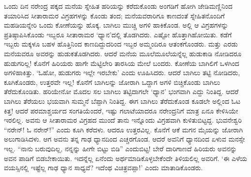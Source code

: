 ಒಂದು ದಿನ ನರೇಂದ್ರ ಪಕ್ಕದ ಮನೆಯ ಸ್ನೇಹಿತ ಹರಿಯನ್ನು ಕರೆದುಕೊಂಡು ಅಂಗಡಿಗೆ ಹೋಗಿ ಜೇಡಿಮಣ್ಣಿನಿಂದ ತಯಾರಿಸಿದ ಸೀತಾರಾಮರ ವಿಗ್ರಹಗಳನ್ನು ಕೊಂಡು ತಂದ; ಮನೆಯವರಾರಿಗೂ ಕಾಣದಂತೆ ಸ್ನೇಹಿತನೊಂದಿಗೆ ಮಹಡಿಯನ್ನೇರಿ ಒಂದು ಕೋಣೆಯನ್ನು ಹೊಕ್ಕ. ಬಾಗಿಲು ಮುಚ್ಚಿ ಅಗಳಿ ಹಾಕಿಕೊಂಡ. ಅಲ್ಲಿ ಆ ವಿಗ್ರಹಗಳನ್ನು ಪ್ರತಿಷ್ಠಾಪಿಸಿಕೊಂಡು ಇಬ್ಬರೂ ಸೀತಾರಾಮರ ‘ಧ್ಯಾನ’ದಲ್ಲಿ ತೊಡಗಿದರು. ಎಷ್ಟೋ ಹೊತ್ತಾಗಿಹೋಯಿತು. ಕಡೆಗೆ ಇಬ್ಬರು ಮಕ್ಕಳೂ ಬಹಳ ಹೊತ್ತಿನಿಂದ ಕಾಣದಿದ್ದುದರಿಂದ ಇಬ್ಬರ ಅಮ್ಮಂದಿರೂ ಆತಂಕಗೊಂಡರು. ಮತ್ತು ಎರಡು ಮನೆಯವರೂ ಅವರನ್ನು ಹುಡುಕತೊಡಗಿದರು. ಆದರೆ ಮನೆಯ ಮೂಲೆಮೂಲೆಯನ್ನೆಲ್ಲ ಹುಡುಕಾಡಿ ನೋಡಿದರೂ ಹುಡುಗರಿಲ್ಲ! ಕೊನೆಗೆ ಹಿರಿಯರು ಹಾಗೇ ಮೆಟ್ಟಿಲೇರಿ ತಾರಸಿಯ ಮೇಲೆ ಬಂದರು. ಕೋಣೆಯ ಬಾಗಿಲಿಗೆ ಒಳಗಿಂದ ಅಗಳಿಹಾಕಿತ್ತು. ‘ಓಹೋ, ಹುಡುಗರು ಇಲ್ಲೇ ಇರಬೇಕು’ ಎಂದು ಊಹಿಸಿದರು. ಆದರೆ ಬಾಗಿಲು ತಟ್ಟಿ ನೋಡಿದರು, ಕೂಗಿಕೊಂಡರು, ಉತ್ತರವೇ ಇಲ್ಲ! ಕೊನೆಗೆ ಬಾಗಿಲನ್ನು ಜೋರಾಗಿ ಒದ್ದಾಗ ಅಗಳಿ ಬಿಚ್ಚಿಕೊಂಡು ಬಾಗಿಲು ತೆರೆದುಕೊಂಡಿತು. ಹರಿಯೇನೋ ಮೊದಲ ಸಲ ಬಾಗಿಲು ತಟ್ಟಿದಾಗಲೇ ‘ಧ್ಯಾನ’ ಭಂಗವಾಗಿ ಎದ್ದು ನಿಂತಿದ್ದ. ಆದರೆ ಬಾಗಿಲು ತೆರೆಯಲು ಭಯವಾಗಿ ಸುಮ್ಮನೆ ಬೆಪ್ಪಾಗಿ ನಿಂತಿದ್ದ. ಈಗ ಬಾಗಿಲು ತೆರೆದುಕೊಂಡ ಕೂಡಲೇ ಅಲ್ಲಿಂದ ಓಟ ಕಿತ್ತ! ಆದರೆ ಪರಮಾಶ್ಚರ್ಯದ ಸಂಗತಿಯೆಂದರೆ, ಇಷ್ಟು ಗಲಾಟೆಯಾದರೂ ನರೇಂದ್ರನಿಗೆ ಮಾತ್ರ ಏನೂ ಕೇಳಿಸಿಯೇ ಇರಲಿಲ್ಲ. ಅವನು ಆ ಸೀತಾರಾಮರ ವಿಗ್ರಹದ ಮುಂದೆ ತಾನು ಇನ್ನೊಂದು ವಿಗ್ರಹವಾಗಿ ಕುಳಿತುಬಿಟ್ಟದ್ದ. ಭುವನೇಶ್ವರಿ “ನರೇನ್! ಓ ನರೇನ್!” ಎಂದು ಕೂಗಿ ಕರೆದಳು. ಆದರೂ ಉತ್ತರವಿಲ್ಲ. ಕೊನೆಗೆ ಆಕೆ ಮಗನ ಮೈಯನ್ನು ಜೋರಾಗಿ ಅಲುಗಾಡಿಸಿದಳು. ಆಗ ಅವನು ತನ್ನ ಗಾಢ ಧ್ಯಾನದಿಂದ ಎಚ್ಚರಗೊಂಡ. ಆದರೆ ಅವನಿಗೆ ಧ್ಯಾನದಿಂದ ಏಳುವ ಮನಸ್ಸೇ ಇಲ್ಲ. “ನಾನು ಬರುವುದಿಲ್ಲ, ನನ್ನನ್ನು ಹೀಗೇ ಬಿಟ್ಟು ಬಿಡಿ” ಎಂದುಬಿಟ್ಟ! ಬೇರೆ ದಾರಿಗಾಣದೆ ಹಿರಿಯರು ಅವನನ್ನು ಅವನ ಪಾಡಿಗೆ ಬಿಡಬೇಕಾಯಿತು. ಇದನ್ನೆಲ್ಲ ಏನೆಂದು ಅರ್ಥಮಾಡಿಕೊಳ್ಳಬೇಕೆಂದೇ ತಿಳಿಯಲಿಲ್ಲ ಅವರಿಗೆ. ‘ಈ ಎಳೆಯ ವಯಸ್ಸಿನಲ್ಲಿ ಇಷ್ಟೆಲ್ಲ ಗಾಢ ಧ್ಯಾನ ಸಾಧ್ಯವೆ? ಇದೆಂಥ ವಿಚಿತ್ರವಪ್ಪಾ!’ ಎಂದು ಮಾತಾಡಿಕೊಂಡರು.

